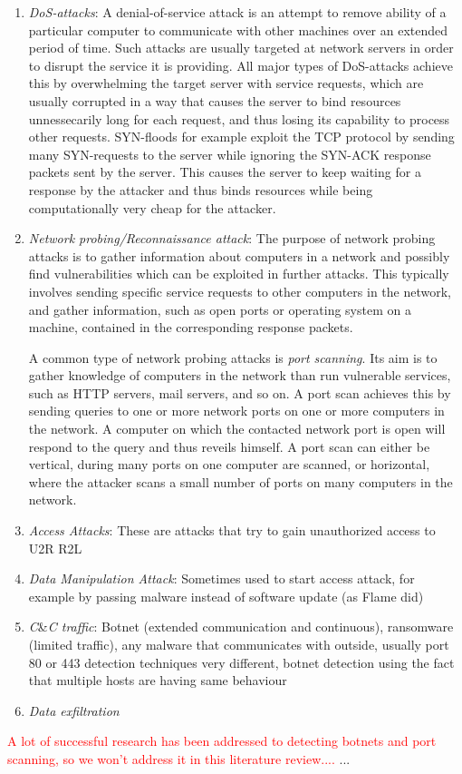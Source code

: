 \documentclass[a4paper,12pt,twoside]{report}
\begin{document}
\begin{enumerate}
\item \textit{DoS-attacks}: A denial-of-service attack is an attempt to remove ability of a particular computer to communicate with other machines over an extended period of time. Such attacks are usually targeted at network servers in order to disrupt the service it is providing. All major types of DoS-attacks achieve this by overwhelming the target server with service requests, which are usually corrupted in a way that causes the server to bind resources unnessecarily long for each request, and thus losing its capability to process other requests. SYN-floods for example exploit the TCP protocol by sending many SYN-requests to the server while ignoring the SYN-ACK response packets sent by the server. This causes the server to keep waiting for a response by the attacker and thus binds resources while being computationally very cheap for the attacker.

\item \textit{Network probing/Reconnaissance attack}: The purpose of network probing attacks is to gather information about computers in a network and possibly find vulnerabilities which can be exploited in further attacks. This typically involves sending specific service requests to other computers in the network, and gather information, such as open ports or operating system on a machine, contained in the corresponding response packets.

A common type of network probing attacks is \textit{port scanning}. Its aim is to gather knowledge of computers in the network than run vulnerable services, such as HTTP servers, mail servers, and so on. A port scan achieves this by sending queries to one or more network ports on one or more computers in the network. A computer on which the contacted network port is open will respond to the query and thus reveils himself. A port scan can either be vertical, during many ports on one computer are scanned, or horizontal, where the attacker scans a small number of ports on many computers in the network. 

\item \textit{Access Attacks}: These are attacks that try to gain unauthorized access to 
U2R R2L 

\item \textit{Data Manipulation Attack}: Sometimes used to start access attack, for example by passing malware instead of software update (as Flame did)

\item \textit{C}\&\textit{C traffic}: Botnet (extended communication and continuous), ransomware (limited traffic), any malware that communicates with outside, usually port 80 or 443 detection techniques very different, botnet detection using the fact that multiple hosts are having same behaviour

\item \textit{Data exfiltration}

\end{enumerate}
\textcolor{red}{A lot of successful research has been addressed to detecting botnets and port scanning, so we won't address it in this literature review....} ...
\end{document}
